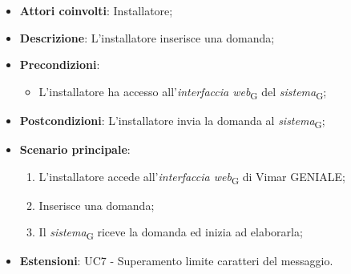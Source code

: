 \begin{itemize}
    \item \textbf{Attori coinvolti}: Installatore;
    \item \textbf{Descrizione}: L’installatore inserisce una domanda;
    \item \textbf{Precondizioni}: 
        \begin{itemize}
            \item L’installatore ha accesso all’\textit{interfaccia web}\textsubscript{G} del \textit{sistema}\textsubscript{G};
        \end{itemize}
    \item \textbf{Postcondizioni}: L'installatore invia la domanda al \textit{sistema}\textsubscript{G};
    \item \textbf{Scenario principale}:
    \begin{enumerate}
    \item L’installatore accede all’\textit{interfaccia web}\textsubscript{G} di Vimar GENIALE;
    \item Inserisce una domanda;
    \item Il \textit{sistema}\textsubscript{G} riceve la domanda ed inizia ad elaborarla;
    \end{enumerate}
    \item \textbf{Estensioni}: UC7 - Superamento limite caratteri del messaggio.
\end{itemize}

